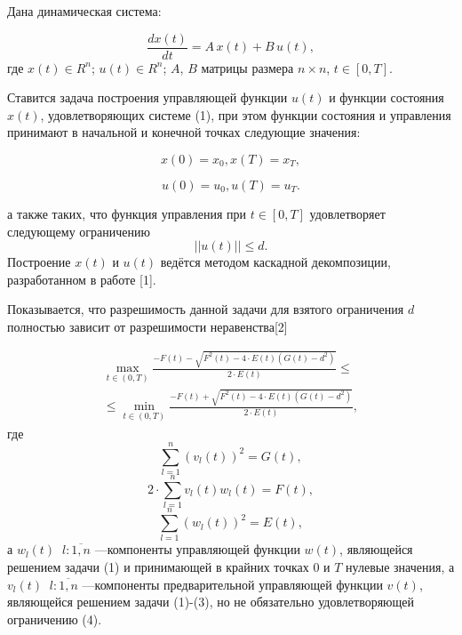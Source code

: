 


\vzmscaption

Дана  динамическая система:

\begin{equation}
\frac{dx(t)}{dt}=A\, x(t)+B\, u(t),
\end{equation}
где $x(t)\in R^{n}$;
$u(t)\in R^{n}$;
$A$, $B$ матрицы размера $n\times n
$,  $t\in [0,T]$.

Ставится задача построения  управляющей функции $u(t)$ и функции состояния $x(t)$, удовлетворяющих системе (1), при этом  функции состояния и управления  принимают в начальной и конечной точках следующие  значения:

\begin{equation}
x(0)=x_{0},x(T)=x_{T},
\end{equation}

\begin{equation}
u(0)=u_{0},u(T)=u_{T}.
\end{equation}

а также таких, что функция управления при $t\in [0,T]$ удовлетворяет следующему ограничению
\begin{equation}
||u(t)||\leqslant d.
\end{equation}
 Построение $x(t)$ и $u(t)$ ведётся методом каскадной декомпозиции, разработанном в работе [1].

Показывается, что разрешимость данной задачи для взятого ограничения $d$ полностью зависит от разрешимости  неравенства[2]

\begin{multline}
\max\limits_{t\in(0,T)}\frac{-F(t)-\sqrt{F^{2}(t)-4\cdot E(t)(G(t)-d^{2})}}{2\cdot E(t)}
\leqslant
\\ \leqslant
\min\limits_{t\in(0,T)}\frac{-F(t)+\sqrt{F^{2}(t)-4\cdot E(t)(G(t)-d^{2})}}{2\cdot E(t)},
\end{multline}
где $$\sum\limits_{l=1}^{n}(v_{l}(t))^{2}=G(t),$$
$$2\cdot\sum\limits_{l=1}^{n}v_{l}(t)w_{l}(t)=F(t),$$
$$\sum\limits_{l=1}^{n}(w_{l}(t))^{2}=E(t),$$
а $w_{l}(t)\;\;l:\overline{1,n}$ ---компоненты управляющей  функции $w(t)$, являющейся решением задачи (1) и принимающей в крайних точках 0 и $T$ нулевые значения, а $v_{l}(t)\;\;l:\overline{1,n}$ ---компоненты предварительной управляющей  функции $v(t)$, являющейся решением задачи (1)-(3), но не обязательно удовлетворяющей ограничению (4).


